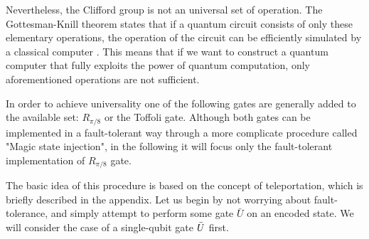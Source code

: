 Nevertheless, the Clifford group is not an universal set of operation.  
The Gottesman-Knill theorem states that if a quantum circuit consists of only these elementary operations, the operation of the circuit can be efficiently simulated by a classical computer \cite{gottesman1998heisenberg}. This means that if we want to construct a quantum computer that fully exploits the power of quantum computation, only aforementioned operations are not sufficient.

In order to achieve universality one of the following gates are generally added to the available set: $R_{\pi/8}$ or the Toffoli gate. 
Although both gates can be implemented in a fault-tolerant way through a more complicate procedure called "Magic state injection", in the following it will focus only the fault-tolerant implementation of  $R_{\pi/8}$ gate. 

The basic idea of this procedure is based on the concept of teleportation, which is briefly described in the appendix.
Let us begin by not worrying about fault-tolerance, and simply attempt to perform some gate $\bar{U}$ on an encoded state. 
We will consider the case of a single-qubit gate $\Bar{U}$ first. \cite{gottesman2009introduction}

